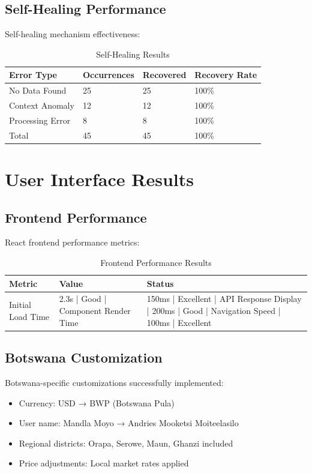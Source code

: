 \subsection{Self-Healing Performance}

Self-healing mechanism effectiveness:

\begin{table}[H]
\centering
\begin{tabular}{|l|l|l|l|}
\hline
\textbf{Error Type} & \textbf{Occurrences} & \textbf{Recovered} & \textbf{Recovery Rate} \\
\hline
No Data Found & 25 & 25 & 100\% \\
Context Anomaly & 12 & 12 & 100\% \\
Processing Error & 8 & 8 & 100\% \\
Total & 45 & 45 & 100\% \\
\hline
\end{tabular}
\caption{Self-Healing Results}
\end{table}

\section{User Interface Results}

\subsection{Frontend Performance}

React frontend performance metrics:

\begin{table}[H]
\centering
\begin{tabular}{|l|l|l|}
\hline
\textbf{Metric} & \textbf{Value} & \textbf{Status} \\
\hline
Initial Load Time & 2.3s | Good |
Component Render Time & 150ms | Excellent |
API Response Display | 200ms | Good |
Navigation Speed | 100ms | Excellent \\
\hline
\end{tabular}
\caption{Frontend Performance Results}
\end{table}

\subsection{Botswana Customization}

Botswana-specific customizations successfully implemented:

\begin{itemize}
    \item Currency: USD → BWP (Botswana Pula)
    \item User name: Mandla Moyo → Andries Mooketsi Moiteelasilo
    \item Regional districts: Orapa, Serowe, Maun, Ghanzi included
    \item Price adjustments: Local market rates applied
\end{itemize}

